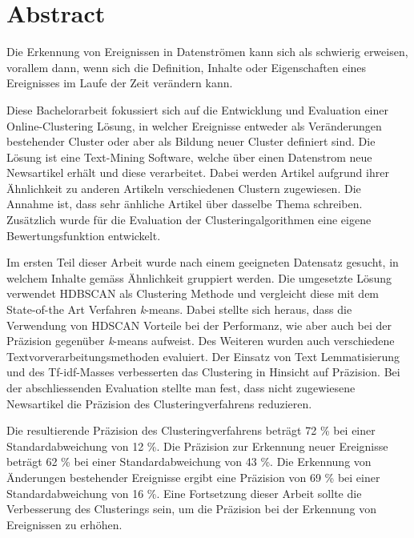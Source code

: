 
\section*{Abstract}

Die Erkennung von Ereignissen in Datenströmen kann sich als schwierig erweisen, vorallem dann,
wenn sich die Definition, Inhalte oder Eigenschaften eines Ereignisses im Laufe der Zeit verändern kann.

Diese Bachelorarbeit fokussiert sich auf die Entwicklung und Evaluation einer Online-Clustering Lösung,
in welcher Ereignisse entweder als Veränderungen bestehender Cluster oder aber als Bildung neuer Cluster
definiert sind.
Die Lösung ist eine Text-Mining Software, welche über einen Datenstrom neue Newsartikel erhält
und diese verarbeitet.
Dabei werden Artikel aufgrund ihrer Ähnlichkeit zu anderen Artikeln verschiedenen Clustern zugewiesen.
Die Annahme ist, dass sehr änhliche Artikel über dasselbe Thema schreiben.
Zusätzlich wurde für die Evaluation der Clusteringalgorithmen eine eigene Bewertungsfunktion entwickelt.

Im ersten Teil dieser Arbeit wurde nach einem geeigneten Datensatz gesucht,
in welchem Inhalte gemäss Ähnlichkeit gruppiert werden.
Die umgesetzte Lösung verwendet HDBSCAN als Clustering Methode und vergleicht diese
mit dem State-of-the Art Verfahren \textit{k}-means.
Dabei stellte sich heraus, dass die Verwendung von HDSCAN Vorteile bei der Performanz,
wie aber auch bei der Präzision gegenüber \textit{k}-means aufweist.
Des Weiteren wurden auch verschiedene Textvorverarbeitungsmethoden evaluiert.
Der Einsatz von Text Lemmatisierung und des Tf-idf-Masses verbesserten
das Clustering in Hinsicht auf Präzision.
Bei der abschliessenden Evaluation stellte man fest,
dass nicht zugewiesene Newsartikel die Präzision des Clusteringverfahrens reduzieren.

Die resultierende Präzision des Clusteringverfahrens beträgt 72 \% bei einer Standardabweichung von 12 \%.
Die Präzision zur Erkennung neuer Ereignisse beträgt 62 \% bei einer Standardabweichung von 43 \%.
Die Erkennung von Änderungen bestehender Ereignisse ergibt eine
Präzision von 69 \% bei einer Standardabweichung von 16 \%.
Eine Fortsetzung dieser Arbeit sollte die Verbesserung des Clusterings sein,
um die Präzision bei der Erkennung von Ereignissen zu erhöhen.
